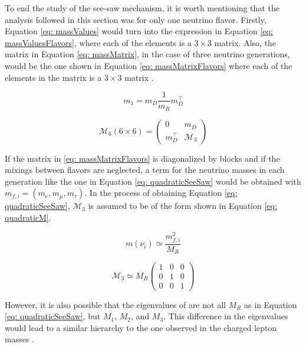 To end the study of the see-saw mechanism, it is worth mentioning that the analysis followed in this section was for only one neutrino flavor. Firstly, Equation \ref{eq: massValues} would turn into the expression in Equation \ref{eq: massValuesFlavors}, where each of the elements is a $3 \times 3$ matrix. Also, the matrix in Equation \ref{eq: massMatrix}, in the case of three neutrino generations, would be the one shown in Equation \ref{eq: massMatrixFlavors} where each of the elements in the matrix is a $3 \times 3$ matrix \cite{NeutrinoMass}. 


\begin{equation}\label{eq: massValuesFlavors}
m_{1} = m_{D}\frac{1}{m_{R}}m_{D}^{\intercal}
\end{equation}

\begin{equation}\label{eq: massMatrixFlavors}
\mathcal{M}_{6}(6\times 6) = \begin{pmatrix} 0&m_{D}\\m_{D}^{\intercal}&\mathcal{M_{\text{3}}} \end{pmatrix}
\end{equation}

If the matrix in \ref{eq: massMatrixFlavors} is diagonalized by blocks and if the mixings between flavors are neglected, a term for the neutrino masses in each generation like the one in Equation \ref{eq: quadraticSeeSaw} would be obtained with $m_{f,i} = (m_{e}, m_{\mu}, m_{\tau})$. In the process of obtaining Equation \ref{eq: quadraticSeeSaw}, $\mathcal{M_{\text{3}}}$ is assumed to be of the form shown in Equation \ref{eq: quadraticM}. 

\begin{equation}\label{eq: quadraticSeeSaw}
m(\nu_{i}) \simeq \frac{m_{f,i}^2}{M_{R}}
\end{equation}

\begin{equation}\label{eq: quadraticM}
\mathcal{M_{\text{3}}} \simeq M_{R} \begin{pmatrix} 1 & 0 & 0\\0 & 1 & 0 \\ 0 & 0 & 1 \end{pmatrix}
\end{equation}

However, it is also possible that the eigenvalues of are not all $M_{R}$ as in Equation \ref{eq: quadraticSeeSaw}, but $M_{1}$, $M_{2}$, and $M_{3}$. This difference in the eigenvalues would lead to a similar hierarchy to the one observed in the charged lepton masses \cite{NeutrinoMass}. 

